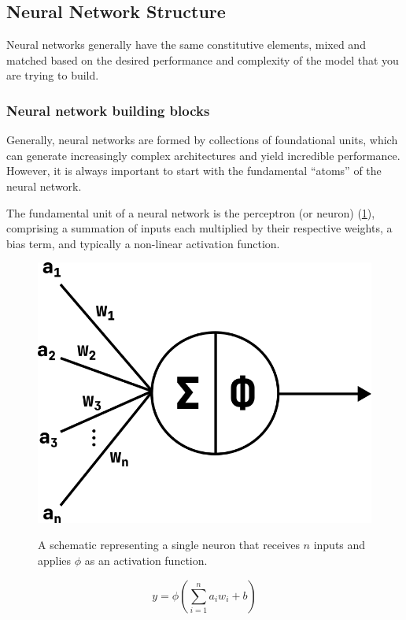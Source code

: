 \subsection{Neural Network Structure}
Neural networks generally have the same constitutive elements, mixed and matched based on the desired performance and complexity of the model that you are trying to build.

\subsubsection{Neural network building blocks}
Generally, neural networks are formed by collections of foundational units, which can generate increasingly complex architectures and yield incredible performance.
However, it is always important to start with the fundamental ``atoms'' of the neural network.

The fundamental unit of a neural network is the perceptron (or neuron) (\cref{fig:neuron}), comprising a summation of inputs each multiplied by their respective weights, a bias term, and typically a non-linear activation function.

\begin{figure}[h!]
    \begin{center}
        {\includegraphics[width=0.55\linewidth]{figs/background/png/neuron.png}}
    \end{center}
    \caption{A schematic representing a single neuron that receives $n$ inputs and applies $\phi$ as an activation function.}
    \label{fig:neuron}
\end{figure}

\begin{equation}
    y = \phi(\sum_{i=1}^{n}a_i w_i + b)
    \label{eq:neuron}
\end{equation}

